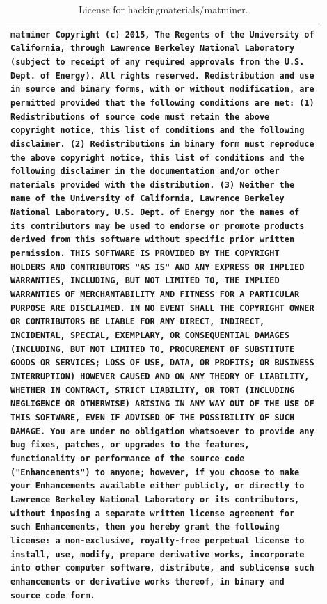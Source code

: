 \begin{table}[h]
\small
\centering
\caption{\label{tab:copyright_matminer}
License for hackingmaterials/matminer.
}
\begin{tabular}{p{0.9\linewidth}}
\toprule
\texttt{matminer Copyright (c) 2015, The Regents of the University of
California, through Lawrence Berkeley National Laboratory (subject
to receipt of any required approvals from the U.S. Dept. of Energy).
All rights reserved.
\newline
Redistribution and use in source and binary forms, with or without
modification, are permitted provided that the following conditions
are met:
\newline
(1) Redistributions of source code must retain the above copyright
notice, this list of conditions and the following disclaimer.
\newline
(2) Redistributions in binary form must reproduce the above
copyright notice, this list of conditions and the following
disclaimer in the documentation and/or other materials provided with
the distribution.
\newline
(3) Neither the name of the University of California, Lawrence
Berkeley National Laboratory, U.S. Dept. of Energy nor the names of
its contributors may be used to endorse or promote products derived
from this software without specific prior written permission.
\newline
THIS SOFTWARE IS PROVIDED BY THE COPYRIGHT HOLDERS AND CONTRIBUTORS
"AS IS" AND ANY EXPRESS OR IMPLIED WARRANTIES, INCLUDING, BUT NOT
LIMITED TO, THE IMPLIED WARRANTIES OF MERCHANTABILITY AND FITNESS
FOR A PARTICULAR PURPOSE ARE DISCLAIMED. IN NO EVENT SHALL THE
COPYRIGHT OWNER OR CONTRIBUTORS BE LIABLE FOR ANY DIRECT, INDIRECT,
INCIDENTAL, SPECIAL, EXEMPLARY, OR CONSEQUENTIAL DAMAGES (INCLUDING,
BUT NOT LIMITED TO, PROCUREMENT OF SUBSTITUTE GOODS OR SERVICES;
LOSS OF USE, DATA, OR PROFITS; OR BUSINESS INTERRUPTION) HOWEVER
CAUSED AND ON ANY THEORY OF LIABILITY, WHETHER IN CONTRACT, STRICT
LIABILITY, OR TORT (INCLUDING NEGLIGENCE OR OTHERWISE) ARISING IN
ANY WAY OUT OF THE USE OF THIS SOFTWARE, EVEN IF ADVISED OF THE
POSSIBILITY OF SUCH DAMAGE.
\newline
You are under no obligation whatsoever to provide any bug fixes,
patches, or upgrades to the features, functionality or performance
of the source code ("Enhancements") to anyone; however, if you
choose to make your Enhancements available either publicly, or
directly to Lawrence Berkeley National Laboratory or its
contributors, without imposing a separate written license agreement
for such Enhancements, then you hereby grant the following license:
a non-exclusive, royalty-free perpetual license to install, use,
modify, prepare derivative works, incorporate into other computer
software, distribute, and sublicense such enhancements or derivative
works thereof, in binary and source code form.
} \\
\bottomrule
\end{tabular}

\vspace{-11pt}
\end{table}